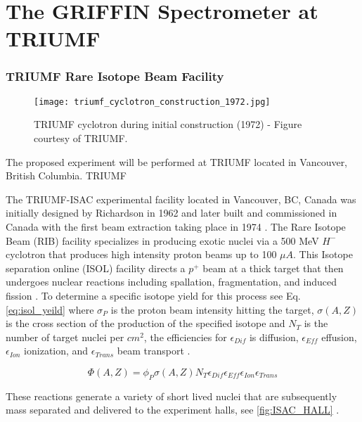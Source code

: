 \documentclass[cnatzke_thesis_proposal.tex]{subfiles}
\begin{document}
\chapter{The GRIFFIN Spectrometer at TRIUMF}

\subsection{TRIUMF Rare Isotope Beam Facility}
\begin{figure}[H]
  \begin{center}
    \texttt{[image: triumf\_cyclotron\_construction\_1972.jpg]}
  \end{center}
  \caption{TRIUMF cyclotron during initial construction (1972) - Figure courtesy of TRIUMF.}
  \label{fig:triumf_cyclotron_1972}
\end{figure}

The proposed experiment will be performed at TRIUMF located in Vancouver, British Columbia. TRIUMF 


The TRIUMF-ISAC experimental facility located in Vancouver, BC, Canada was initially designed by Richardson in 1962 and later built and commissioned in Canada with the first beam extraction taking place in 1974 \cite{Bylinskii2014}. The Rare Isotope Beam (RIB) facility specializes in producing exotic nuclei via a 500 MeV $H^{-}$ cyclotron that produces high intensity proton beams up to 100 $\mu A$.  This Isotope separation online (ISOL) facility directs a $p^+$ beam at a thick target that then undergoes nuclear reactions including spallation, fragmentation, and induced fission \cite{Bricault2014}.  To determine a specific isotope yield for this process see Eq.\ref{eq:isol_yeild} where $\sigma_P$ is the proton beam intensity hitting the target, $\sigma(A, Z)$ is the cross section of the production of the specified isotope and $N_T$ is the number of target nuclei per $cm^2$, the efficiencies for $\epsilon_{Dif}$ is diffusion, $\epsilon_{Eff}$ effusion,  $\epsilon_{Ion}$ ionization, and $\epsilon_{Trans}$ beam transport \cite{Bricault2014}.

\begin{equation}
  \Phi(A,Z) = \phi_P \sigma(A,Z) N_T \epsilon_{Dif} \epsilon_{Eff} \epsilon_{Ion} \epsilon_{Trans}
  \label{eq:isol_yeild}
\end{equation}

These reactions generate a variety of short lived nuclei that are subsequently mass separated and delivered to the experiment halls, see \ref{fig:ISAC_HALL} \cite{Dombsky2014}.
\end{document}
